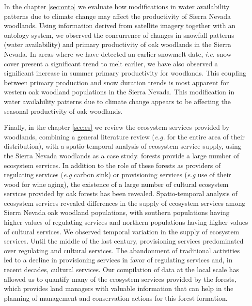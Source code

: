 In the \textcolor{ctcolormain}{chapter \ref{sec:onto}} we evaluate how modifications in water availability patterns due to climate change may affect the productivity of Sierra Nevada \Qp woodlands. Using information derived from satellite imagery together with an ontology system, we observed the concurrence of changes in snowfall patterns (water availability) and primary productivity of oak woodlands in the Sierra Nevada. In areas where we have detected an earlier snowmelt date, \emph{i.e.} snow cover present a significant trend to melt earlier, we have also observed a significant increase in summer primary productivity for \Qp woodlands. This coupling between primary production and snow duration trends is most apparent for western oak woodland populations in the Sierra Nevada. This modification in water availability patterns due to climate change appears to be affecting the seasonal productivity of oak woodlands.

Finally, in the \textcolor{ctcolormain}{chapter \ref{sec:es}} we review the ecosystem services provided by \Qp woodlands, combining a general literature review (\emph{e.g.} for the entire area of their distribution), with a spatio-temporal analysis of ecosystem service supply, using the Sierra Nevada \Qp woodlands as a case study. \Qp forests provide a large number of ecosystem services. In addition to the role of these forests as providers of regulating services (\emph{e.g} carbon sink) or provisioning services (\emph{e.g} use of their wood for wine aging), the existence of a large number of cultural ecosystem services provided by oak forests has been revealed. Spatio-temporal analysis of ecosystem services revealed differences in the supply of ecosystem services among Sierra Nevada oak woodland populations, with southern populations having higher values of regulating services and northern populations having higher values of cultural services. We observed temporal variation in the supply of ecosystem services. Until the middle of the last century, provisioning services predominated over regulating and cultural services. The abandonment of traditional activities led to a decline in provisioning services in favor of regulating services and, in recent decades, cultural services. Our compilation of data at the local scale has allowed us to quantify many of the ecosystem services provided by the \Qp forests, which provides land managers with valuable information that can help in the planning of management and conservation actions for this forest formation. 